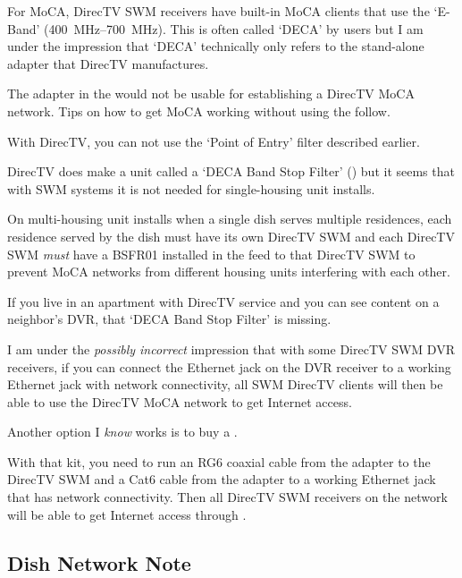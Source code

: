 For MoCA, DirecTV SWM receivers have built-in MoCA clients that use the `E-Band' (\SIrange{400}{700}{\mega\hertz}).
This is often called `DECA' by users but I am under the impression that `DECA' technically only refers to the
stand-alone \eband{} adapter that DirecTV manufactures.

The \xdband{} adapter in the  would not be usable for establishing a DirecTV MoCA
network. Tips on how to get MoCA working without using the  follow.

With DirecTV, you can not use the `Point of Entry' filter described earlier.

DirecTV does make a unit called a `DECA Band Stop Filter'
()
but it seems that with SWM systems it is not needed for single-housing unit installs.

On multi-housing unit installs when a single dish serves multiple residences, each residence served by
the dish must have its own DirecTV SWM  and each DirecTV SWM
 \emph{must} have a BSFR01 installed in the feed to that DirecTV SWM
 to prevent MoCA networks from different housing units interfering with
each other.

If you live in an apartment with DirecTV service and you can see content on a neighbor's DVR, that `DECA
Band Stop Filter' is missing.

I am under the \emph{possibly incorrect} impression that with some DirecTV SWM DVR receivers, if you can
connect the Ethernet jack on the DVR receiver to a working Ethernet jack with network connectivity,
all SWM DirecTV clients will then be able to use the DirecTV MoCA network to get Internet access.

Another option I \emph{know} works is to buy a
.

With that kit, you need to run an RG6 coaxial cable from the adapter to the DirecTV SWM 
and a Cat6 cable from the adapter to a working Ethernet jack that has network connectivity. Then
all DirecTV SWM receivers on the network will be able to get Internet access through \eband{}.

\subsection{Dish Network Note}

